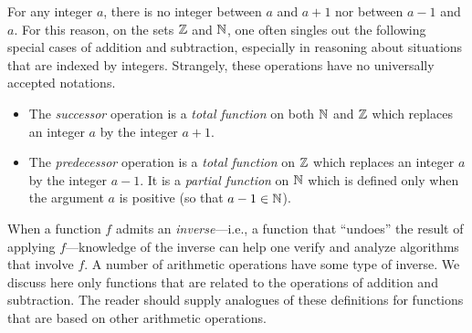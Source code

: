 \medskip

 

For any integer $a$, there is no integer between $a$ and $a+1$ nor between $a-1$ and $a$. For this reason, on the sets $\mathbb{Z}$ and $\mathbb{N}$, one often singles out the following special cases of addition and subtraction, especially in reasoning about situations that are indexed by integers.  Strangely, these operations have no universally accepted notations.
\begin{itemize}
\item
The {\it successor} operation is a {\em total function} on both $\mathbb{N}$ and $\mathbb{Z}$ which replaces an
integer $a$ by the integer $a+1$.
\medskip\item
The {\it predecessor} operation is a {\em total function} on $\mathbb{Z}$ which replaces an integer $a$ by the integer $a-1$.  It is a {\em partial function} on $\mathbb{N}$ which is defined only when the argument $a$ is positive (so that $a-1 \in \mathbb{N}$).
\end{itemize}

\medskip



When a function $f$ admits an {\em inverse}---i.e., a function that ``undoes'' the result of applying $f$---knowledge of the inverse can help one verify and analyze algorithms that involve $f$.  A number of arithmetic operations have some type of inverse.  We discuss here only functions that are related to the operations of addition and subtraction.  The reader should supply analogues of these definitions for functions that are based on other arithmetic operations.

